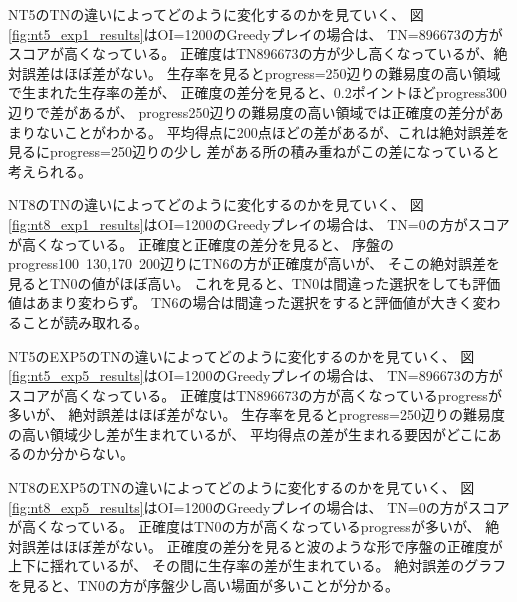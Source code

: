 NT5のTNの違いによってどのように変化するのかを見ていく、
図\ref{fig:nt5_exp1_results}はOI=1200のGreedyプレイの場合は、
TN=896673の方がスコアが高くなっている。
正確度はTN896673の方が少し高くなっているが、絶対誤差はほぼ差がない。
生存率を見るとprogress=250辺りの難易度の高い領域で生まれた生存率の差が、
正確度の差分を見ると、0.2ポイントほどprogress300辺りで差があるが、
progress250辺りの難易度の高い領域では正確度の差分があまりないことがわかる。
平均得点に200点ほどの差があるが、これは絶対誤差を見るにprogress=250辺りの少し
差がある所の積み重ねがこの差になっていると考えられる。

NT8のTNの違いによってどのように変化するのかを見ていく、
図\ref{fig:nt8_exp1_results}はOI=1200のGreedyプレイの場合は、
TN=0の方がスコアが高くなっている。
正確度と正確度の差分を見ると、
序盤のprogress100~130,170~200辺りにTN6の方が正確度が高いが、
そこの絶対誤差を見るとTN0の値がほぼ高い。
これを見ると、TN0は間違った選択をしても評価値はあまり変わらず。
TN6の場合は間違った選択をすると評価値が大きく変わることが読み取れる。

NT5のEXP5のTNの違いによってどのように変化するのかを見ていく、
図\ref{fig:nt5_exp5_results}はOI=1200のGreedyプレイの場合は、
TN=896673の方がスコアが高くなっている。
正確度はTN896673の方が高くなっているprogressが多いが、
絶対誤差はほぼ差がない。
生存率を見るとprogress=250辺りの難易度の高い領域少し差が生まれているが、
平均得点の差が生まれる要因がどこにあるのか分からない。

NT8のEXP5のTNの違いによってどのように変化するのかを見ていく、
図\ref{fig:nt8_exp5_results}はOI=1200のGreedyプレイの場合は、
TN=0の方がスコアが高くなっている。
正確度はTN0の方が高くなっているprogressが多いが、
絶対誤差はほぼ差がない。
正確度の差分を見ると波のような形で序盤の正確度が上下に揺れているが、
その間に生存率の差が生まれている。
絶対誤差のグラフを見ると、TN0の方が序盤少し高い場面が多いことが分かる。

